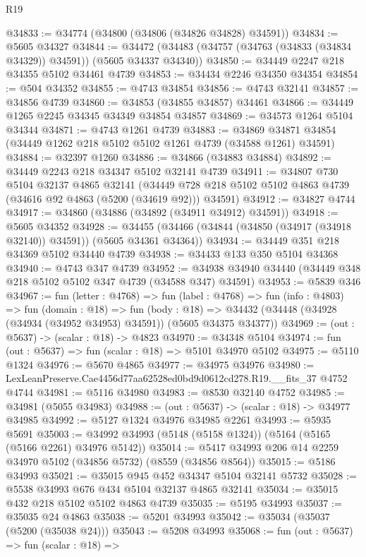 \begin{lexlean}{R19}
\begin{coremodule}
{{{{{{{{{{{@34833 := @34774 (@34800 (@34806 (@34826 @34828) @34591))
@34834 := @5605 @34327
@34844 := @34472 (@34483 (@34757 (@34763 (@34833 (@34834 @34329)) @34591)) (@5605 @34337 @34340))
@34850 := @34449 @2247 @218 @34355 @5102 @34461 @4739
@34853 := @34434 @2246 @34350 @34354
@34854 := @504 @34352
@34855 := @4743 @34854
@34856 := @4743 @32141
@34857 := @34856 @4739
@34860 := @34853 (@34855 @34857) @34461
@34866 := @34449 @1265 @2245 @34345 @34349 @34854 @34857
@34869 := @34573 @1264 @5104 @34344
@34871 := @4743 @1261 @4739
@34883 := @34869 @34871 @34854 (@34449 @1262 @218 @5102 @5102 @1261 @4739 (@34588 @1261) @34591)
@34884 := @32397 @1260
@34886 := @34866 (@34883 @34884)
@34892 := @34449 @2243 @218 @34347 @5102 @32141 @4739
@34911 := @34807
    @730
    @5104
    @32137
    @4865
    @32141
    (@34449 @728 @218 @5102 @5102 @4863 @4739 (@34616 @92 @4863 (@5200 (@34619 @92))) @34591)
@34912 := @34827 @4744
@34917 := @34860 (@34886 (@34892 (@34911 @34912) @34591))
@34918 := @5605 @34352
@34928 := @34455 (@34466 (@34844 (@34850 (@34917 (@34918 @32140)) @34591)) (@5605 @34361 @34364))
@34934 := @34449 @351 @218 @34369 @5102 @34440 @4739
@34938 := @34433 @133 @350 @5104 @34368
@34940 := @4743 @347 @4739
@34952 := @34938 @34940 @34440 (@34449 @348 @218 @5102 @5102 @347 @4739 (@34588 @347) @34591)
@34953 := @5839 @346
@34967 := fun (letter : @4768) =>
  fun (label : @4768) =>
  fun (info : @4803) =>
  fun (domain : @18) =>
  fun (body : @18) => @34432 (@34448 (@34928 (@34934 (@34952 @34953) @34591)) (@5605 @34375 @34377))
@34969 := (out : @5637) -> (scalar : @18) -> @4823
@34970 := @34348 @5104
@34974 := fun (out : @5637) => fun (scalar : @18) => @5101 @34970 @5102
@34975 := @5110 @1324
@34976 := @5670 @4865
@34977 := @34975 @34976
@34980 := LexLeanPreserve.Cae4456d77aa62528ed0bd9d0612cd278.R19.__fits_37 @4752 @4744
@34981 := @5116 @34980
@34983 := @8530 @32140 @4752
@34985 := @34981 (@5055 @34983)
@34988 := (out : @5637) -> (scalar : @18) -> @34977 @34985
@34992 := @5127 @1324 @34976 @34985 @2261
@34993 := @5935 @5691
@35003 := @34992 @34993 (@5148 (@5158 @1324)) (@5164 (@5165 (@5166 @2261) @34976 @5142))
@35014 := @5417 @34993 @206 @14 @2259 @34970 @5102 (@34856 @5732) (@8559 (@34856 @8564))
@35015 := @5186 @34993
@35021 := @35015 @945 @452 @34347 @5104 @32141 @5732
@35028 := @5538 @34993 @676 @434 @5104 @32137 @4865 @32141
@35034 := @35015 @432 @218 @5102 @5102 @4863 @4739
@35035 := @5195 @34993
@35037 := @35035 @24 @4863
@35038 := @5201 @34993
@35042 := @35034 (@35037 (@5200 (@35038 @24)))
@35043 := @5208 @34993
@35068 := fun (out : @5637) =>
  fun (scalar : @18) =>
}}}}}}}}}}}
\end{coremodule}
\end{lexlean}
